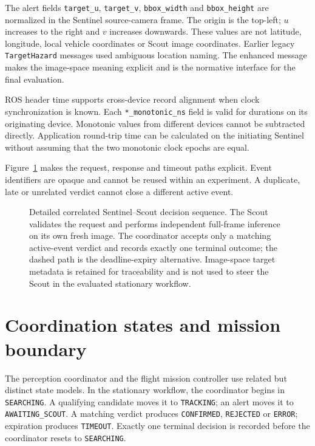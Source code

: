 The alert fields \texttt{target\_u}, \texttt{target\_v},
\texttt{bbox\_width} and \texttt{bbox\_height} are normalized in the Sentinel
source-camera frame. The origin is the top-left; \(u\) increases to the right
and \(v\) increases downwards. These values are not latitude, longitude, local
vehicle coordinates or Scout image coordinates. Earlier legacy
\texttt{TargetHazard} messages used ambiguous location naming. The enhanced
message makes the image-space meaning explicit and is the normative interface
for the final evaluation.

ROS header time supports cross-device record alignment when clock
synchronization is known. Each \texttt{*\_monotonic\_ns} field is valid for
durations on its originating device. Monotonic values from different devices
cannot be subtracted directly. Application round-trip time can be calculated
on the initiating Sentinel without assuming that the two monotonic clock
epochs are equal.

Figure~\ref{fig:decision-sequence} makes the request, response and timeout paths
explicit. Event identifiers are opaque and cannot be reused within an
experiment. A duplicate, late or unrelated verdict cannot close a different
active event.

\begin{figure}[p]
  \centering
  \resizebox{0.96\textwidth}{!}{}
  \caption{Detailed correlated Sentinel--Scout decision sequence. The Scout
  validates the request and performs independent full-frame inference on its
  own fresh image. The coordinator accepts only a matching active-event
  verdict and records exactly one terminal outcome; the dashed path is the
  deadline-expiry alternative. Image-space target metadata is retained for
  traceability and is not used to steer the Scout in the evaluated stationary
  workflow.}
  \label{fig:decision-sequence}
\end{figure}
\clearpage

\section{Coordination states and mission boundary}
\label{sec:architecture:states}

The perception coordinator and the flight mission controller use related but
distinct state models. In the stationary workflow, the coordinator begins in
\texttt{SEARCHING}. A qualifying candidate moves it to \texttt{TRACKING}; an
alert moves it to \texttt{AWAITING\_SCOUT}. A matching verdict produces
\texttt{CONFIRMED}, \texttt{REJECTED} or \texttt{ERROR}; expiration produces
\texttt{TIMEOUT}. Exactly one terminal decision is recorded before the
coordinator resets to \texttt{SEARCHING}.

